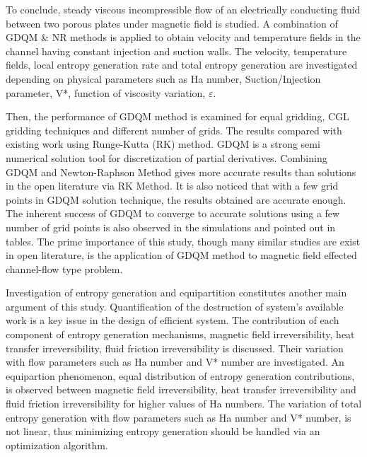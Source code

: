 To conclude, steady viscous incompressible flow of an electrically conducting fluid between two porous plates under magnetic field is studied. A combination of GDQM \& NR methods is applied to obtain velocity and temperature fields in the channel having constant injection and suction walls. The velocity, temperature fields, local entropy generation rate and total entropy generation are investigated depending on physical parameters such as Ha number, Suction/Injection parameter, V*, function of viscosity variation, $\varepsilon $.

Then, the performance of GDQM method is examined for equal gridding, CGL gridding techniques and different number of grids. The results compared with existing work using Runge-Kutta (RK) method. GDQM is a strong semi numerical solution tool for discretization of partial derivatives. Combining GDQM and Newton-Raphson Method gives more accurate results than solutions in the open literature via RK Method. It is also noticed that with a few grid points in GDQM solution technique, the results obtained are accurate enough. The inherent success of GDQM to converge to accurate solutions using a few number of grid points is also observed in the simulations and pointed out in tables. The prime importance of this study, though many similar studies are exist in open literature, is the application of GDQM method to magnetic field effected channel-flow type problem. 

Investigation of entropy generation and equipartition constitutes another main argument of this study. Quantification of the destruction of system's available work is a key issue in the design of efficient system. The contribution of each component of entropy generation mechanisms, magnetic field irreversibility, heat transfer irreversibility, fluid friction irreversibility is discussed. Their variation with flow parameters such as Ha number and V* number are investigated. An equipartion phenomenon, equal distribution of entropy generation contributions, is observed between magnetic field irreversibility, heat transfer irreversibility and fluid friction irreversibility for higher values of Ha numbers. The variation of total entropy generation with flow parameters such as Ha number and V* number, is not linear, thus minimizing entropy generation should be handled via an optimization algorithm.

